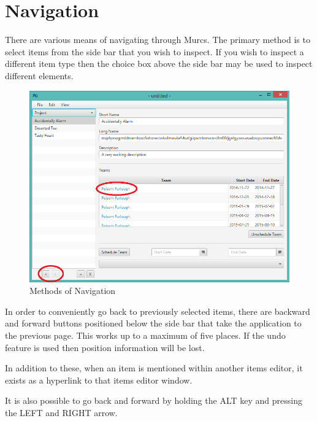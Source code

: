 \section{Navigation}

There are various means of navigating through Murcs. The primary method is to select items from the side bar that you wish to inspect. If you wish to inspect a different item type then the choice box above the side bar may be used to inspect different elements.

\begin{figure}[H]
\centering
\includegraphics[width=\textwidth]{images/screenshots/navigation.PNG}
\caption{Methods of Navigation}
\label{fig:new_project}
\end{figure}

In order to conveniently go back to previously selected items, there are backward and forward buttons positioned below the side bar that take the application to the previous page. This works up to a maximum of five places. If the undo feature is used then position information will be lost.

In addition to these, when an item is mentioned within another items editor, it exists as a hyperlink to that items editor window.

It is also possible to go back and forward by holding the ALT key and pressing the LEFT and RIGHT arrow.